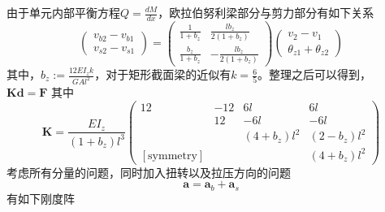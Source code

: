 \documentclass[forprint]{WHUBachelor}
\begin{document}
由于单元内部平衡方程$Q=\frac{d M}{d x}$，欧拉伯努利梁部分与剪力部分有如下关系
\begin{equation} 
\left(\begin{array}{c}{v_{b 2}-v_{b 1}} \\ {v_{s 2}-v_{s 1}}\end{array}\right)=\left(\begin{array}{cc}{\frac{1}{1+b_{z}}} & {\frac{l b_{z}}{2\left(1+b_{z}\right)}} \\ {\frac{b_{z}}{1+b_{z}}} & {-\frac{l b_{z}}{2\left(1+b_{z}\right)}}\end{array}\right)\left(\begin{array}{c}{v_{2}-v_{1}} \\ {\theta_{z 1}+\theta_{z 2}}\end{array}\right)
 \end{equation}
其中，$b_{z} :=\frac{12 E I_{z} k}{G A l^{2}}$，对于矩形截面梁的近似有$k=\frac{6}{5}$。整理之后可以得到，
$\boldsymbol{K} \boldsymbol{d}=\boldsymbol{F}$
其中
\begin{equation} 
\boldsymbol{K}=\frac{E I_{z}}{\left(1+b_{z}\right) l^{3}}\left(\begin{array}{cccc}{12} & {-12} & {6 l} & {6 l} \\ { } & {12} & {-6 l} & {-6 l} \\ { } & { } & {\left(4+b_{z}\right) l^{2}} & {\left(2-b_{z}\right) l^{2}} \\ {[\text {symmetry}]} & & & {\left(4+b_{z}\right) l^{2}} \end{array}\right)
 \end{equation}
考虑所有分量的问题，同时加入扭转以及拉压方向的问题
\begin{equation} 
\boldsymbol{a}=\boldsymbol{a}_{b}+\boldsymbol{a}_{s}
 \end{equation}
有如下刚度阵
\end{document}

